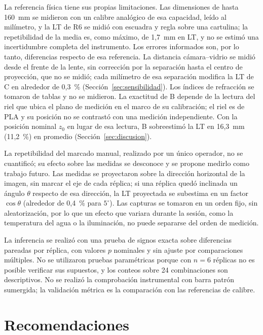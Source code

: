 La referencia física tiene sus propias limitaciones. Las dimensiones de hasta 160~mm se midieron con un calibre analógico de esa capacidad, leído al milímetro, y la LT de R6 se midió con escuadra y regla sobre una cartulina; la repetibilidad de la media es, como máximo, de 1,7~mm en LT, y no se estimó una incertidumbre completa del instrumento. Los errores informados son, por lo tanto, diferencias respecto de esa referencia. La distancia cámara--vidrio se midió desde el frente de la lente, sin corrección por la separación hasta el centro de proyección, que no se midió; cada milímetro de esa separación modifica la LT de C en alrededor de 0,3~\% (Sección~\ref{sec:sensibilidad}). Los índices de refracción se tomaron de tablas y no se midieron. La exactitud de B depende de la lectura del riel que ubica el plano de medición en el marco de su calibración; el riel es de PLA y su posición no se contrastó con una medición independiente. Con la posición nominal $z_0$ en lugar de esa lectura, B sobreestimó la LT en 16,3~mm (11,2~\%) en promedio (Sección~\ref{sec:discusion}).

La repetibilidad del marcado manual, realizado por un único operador, no se cuantificó; su efecto sobre las medidas se desconoce y se propone medirlo como trabajo futuro. Las medidas se proyectaron sobre la dirección horizontal de la imagen, sin marcar el eje de cada réplica; si una réplica quedó inclinada un ángulo $\theta$ respecto de esa dirección, la LT proyectada se subestima en un factor $\cos\theta$ (alrededor de 0,4~\% para $5^{\circ}$). Las capturas se tomaron en un orden fijo, sin aleatorización, por lo que un efecto que variara durante la sesión, como la temperatura del agua o la iluminación, no puede separarse del orden de medición.

La inferencia se realizó con una prueba de signos exacta sobre diferencias pareadas por réplica, con valores $p$ nominales y sin ajuste por comparaciones múltiples. No se utilizaron pruebas paramétricas porque con $n = 6$ réplicas no es posible verificar sus supuestos, y los conteos sobre 24 combinaciones son descriptivos. No se realizó la comprobación instrumental con barra patrón sumergida; la validación métrica es la comparación con las referencias de calibre.

\section{Recomendaciones}

